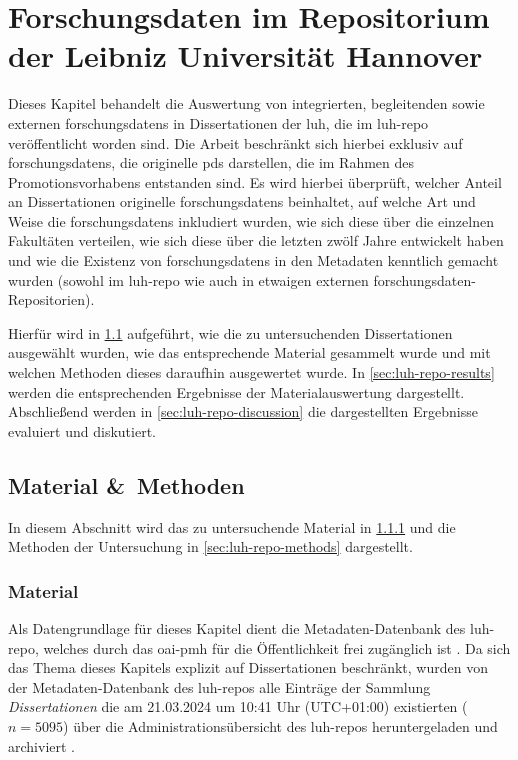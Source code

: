 \chapter{Forschungsdaten im Repositorium der Leibniz Universität Hannover}\label{ch:luh-repo}
Dieses Kapitel behandelt die Auswertung von integrierten, begleitenden sowie externen \glspl{forschungsdaten} in Dissertationen der \gls{luh}, die im \gls{luh-repo} veröffentlicht worden sind.
Die Arbeit beschränkt sich hierbei exklusiv auf \glspl{forschungsdaten}, die originelle \glspl{pd} darstellen, die im Rahmen des Promotionsvorhabens entstanden sind.
Es wird hierbei überprüft, welcher Anteil an Dissertationen originelle \glspl{forschungsdaten} beinhaltet, auf welche Art und Weise die \glspl{forschungsdaten} inkludiert wurden, wie sich diese über die einzelnen Fakultäten verteilen, wie sich diese über die letzten zwölf Jahre entwickelt haben und wie die Existenz von \glspl{forschungsdaten} in den Metadaten kenntlich gemacht wurden (sowohl im \gls{luh-repo} wie auch in etwaigen externen \gls{forschungsdaten}-Repositorien).

Hierfür wird in \cref{sec:luh-repo-material-methods} aufgeführt, wie die zu untersuchenden Dissertationen ausgewählt wurden, wie das entsprechende Material gesammelt wurde und mit welchen Methoden dieses daraufhin ausgewertet wurde.
In \cref{sec:luh-repo-results} werden die entsprechenden Ergebnisse der Materialauswertung dargestellt.
Abschließend werden in \cref{sec:luh-repo-discussion} die dargestellten Ergebnisse evaluiert und diskutiert.

\section{Material \&\ Methoden}\label{sec:luh-repo-material-methods}
In diesem Abschnitt wird das zu untersuchende Material in \cref{sec:luh-repo-material} und die Methoden der Untersuchung in \cref{sec:luh-repo-methods} dargestellt.

\subsection{Material}\label{sec:luh-repo-material}
Als Datengrundlage für dieses Kapitel dient die Metadaten-Datenbank des \gls{luh-repo}, welches durch das \gls{oai-pmh} für die Öffentlichkeit frei zugänglich ist \autocite{luh-repo}.
Da sich das Thema dieses Kapitels explizit auf Dissertationen beschränkt, wurden von der Metadaten-Datenbank des \gls{luh-repo}s alle Einträge der Sammlung \textit{Dissertationen} die am 21.03.2024 um 10:41 Uhr (UTC+01:00) existierten ($n=5095$) über die Administrationsübersicht des \gls{luh-repo}s heruntergeladen und archiviert \autocite{my-dataset}.

